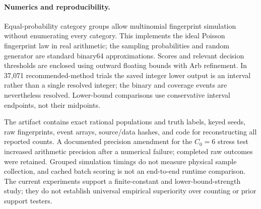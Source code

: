 \paragraph{Numerics and reproducibility.}
Equal-probability category groups allow multinomial fingerprint simulation
without enumerating every category. This implements the ideal Poisson
fingerprint law in real arithmetic; the sampling probabilities and random
generator are standard binary64 approximations. Scores and relevant
decision thresholds are enclosed using outward floating bounds with Arb
refinement. In 37,071 recommended-method trials the saved integer lower
output is an interval rather than a single resolved integer; the binary
and coverage events are nevertheless resolved. Lower-bound comparisons
use conservative interval endpoints, not their midpoints.

The artifact contains exact rational populations and truth labels, keyed
seeds, raw fingerprints, event arrays, source/data hashes, and code for
reconstructing all reported counts. A documented precision amendment for
the $C_0=6$ stress test increased arithmetic precision after a numerical
failure; completed raw outcomes were retained. Grouped simulation timings
do not measure physical sample collection, and cached batch scoring is not
an end-to-end runtime comparison. The current experiments support a
finite-constant and lower-bound-strength study; they do not establish
universal empirical superiority over counting or prior support testers.
